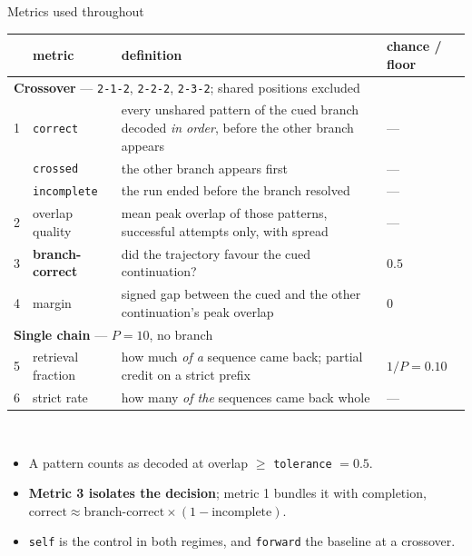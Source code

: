 \documentclass[aspectratio=169]{beamer}
\begin{document}
\begin{frame}{Metrics used throughout}
  \centering\scriptsize
  \begin{tabular}{llp{5.9cm}l}
    \toprule
    & metric & definition & chance / floor \\
    \midrule
    \multicolumn{4}{l}{\textbf{Crossover} --- \texttt{2-1-2}, \texttt{2-2-2}, \texttt{2-3-2}; shared positions excluded} \\
    \midrule
    1 & \texttt{correct}        & every unshared pattern of the cued branch decoded \emph{in order}, before the other branch appears & --- \\
      & \texttt{crossed}        & the other branch appears first & --- \\
      & \texttt{incomplete}     & the run ended before the branch resolved & --- \\
    2 & overlap quality         & mean peak overlap of those patterns, successful attempts only, with spread & --- \\
    3 & \textbf{branch-correct} & did the trajectory favour the cued continuation? & $0.5$ \\
    4 & margin                  & signed gap between the cued and the other continuation's peak overlap & $0$ \\
    \midrule
    \multicolumn{4}{l}{\textbf{Single chain} --- $P = 10$, no branch} \\
    \midrule
    5 & retrieval fraction      & how much \emph{of a} sequence came back; partial credit on a strict prefix & $1/P = 0.10$ \\
    6 & strict rate             & how many \emph{of the} sequences came back whole & --- \\
    \bottomrule
  \end{tabular}
  \\[2mm]
  \begin{itemize}\scriptsize
    \item A pattern counts as decoded at overlap $\ge$ \texttt{tolerance} $= 0.5$.
    \item \textbf{Metric 3 isolates the decision}; metric 1 bundles it with completion,
      $\text{correct} \approx \text{branch-correct} \times (1 - \text{incomplete})$.
    \item \texttt{self} is the control in both regimes, and \texttt{forward} the baseline at a crossover.
  \end{itemize}
\end{frame}
\end{document}
